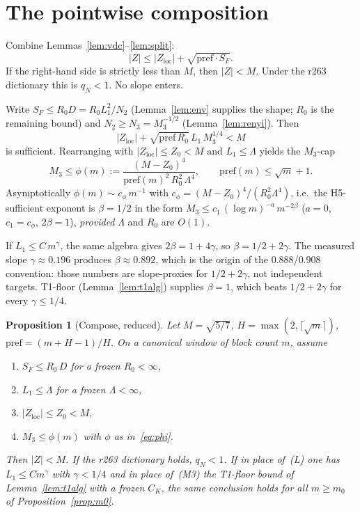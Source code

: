\documentclass[11pt]{article}
\newtheorem{prop}{Proposition}
\theoremstyle{remark}
\newcommand{\pref}{\mathrm{pref}}
\newcommand{\loc}{\mathrm{loc}}
\begin{document}
\section{The pointwise composition}\label{sec:compose}

Combine Lemmas~\ref{lem:vdc}--\ref{lem:split}:
\[
  |Z|
  \le |Z_{\loc}|+\sqrt{\pref\cdot S_F}.
\]
If the right-hand side is strictly less than $M$, then $|Z|<M$.
Under the r263 dictionary this is $q_N<1$.  No slope enters.

Write $S_F\le R_0 D=R_0 L_1^2/N_2$ (Lemma~\ref{lem:env} supplies
the shape; $R_0$ is the remaining bound) and $N_2\ge N_3=M_3^{-1/2}$
(Lemma~\ref{lem:renyi}).  Then
\[
  |Z_{\loc}|+\sqrt{\pref\,R_0}\,L_1\,M_3^{1/4}<M
\]
is sufficient.  Rearranging with $|Z_{\loc}|\le Z_0<M$ and
$L_1\le\Lambda$ yields the $M_3$-cap
\begin{equation}\label{eq:phi}
  M_3
  \le\phi(m)
  :=
  \frac{(M-Z_0)^4}{\pref(m)^2\,R_0^2\,\Lambda^4},
  \qquad
  \pref(m)\le\sqrt{m}+1.
\end{equation}
Asymptotically $\phi(m)\sim c_\phi\, m^{-1}$ with
$c_\phi=(M-Z_0)^4/(R_0^2\Lambda^4)$, i.e.\ the H5-sufficient
exponent is $\beta=1/2$ in the form
$M_3\le c_1\,(\log m)^{-a}\,m^{-2\beta}$
($a=0$, $c_1=c_\phi$, $2\beta=1$), \emph{provided} $\Lambda$ and
$R_0$ are $O(1)$.

If $L_1\le C\,m^\gamma$, the same algebra gives $2\beta=1+4\gamma$,
so $\beta=1/2+2\gamma$.  The measured slope $\gamma\approx 0.196$
produces $\beta\approx 0.892$, which is the origin of the
$0.888$/$0.908$ convention: those numbers are slope-proxies for
$1/2+2\gamma$, not independent targets.  T1-floor
(Lemma~\ref{lem:t1alg}) supplies $\beta=1$, which beats
$1/2+2\gamma$ for every $\gamma\le 1/4$.

\begin{prop}[Compose, reduced]\label{prop:compose}
Let $M=\sqrt{5/7}$, $H=\max(2,\lceil\sqrt{m}\rceil)$,
$\pref=(m+H-1)/H$.  On a canonical window of block count $m$,
assume
\begin{enumerate}
\item[\rm(R)] $S_F\le R_0\,D$ for a frozen $R_0<\infty$,
\item[\rm(L)] $L_1\le\Lambda$ for a frozen $\Lambda<\infty$,
\item[\rm(Z)] $|Z_{\loc}|\le Z_0<M$,
\item[\rm(M3)] $M_3\le\phi(m)$ with $\phi$ as in~\eqref{eq:phi}.
\end{enumerate}
Then $|Z|<M$.  If the r263 dictionary holds, $q_N<1$.
If in place of~\rm(L) one has $L_1\le C m^\gamma$ with
$\gamma<1/4$ and in place of~\rm(M3) the T1-floor bound of
Lemma~\ref{lem:t1alg} with a frozen $C_K$, the same conclusion
holds for all $m\ge m_0$ of Proposition~\ref{prop:m0}.
\end{prop}
\end{document}
